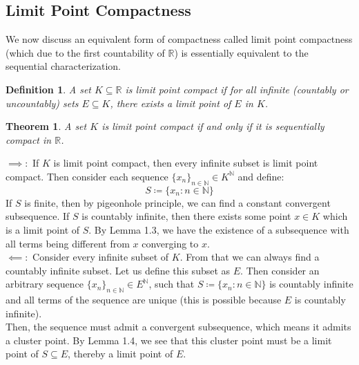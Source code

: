 \documentclass[10pt,letterpaper]{article} %
\newtheorem{thm}{Theorem}[section]
\newtheorem{defn}{Definition}[section]
\begin{document}
\subsection{Limit Point Compactness}
We now discuss an equivalent form of compactness called limit point compactness (which due to the first countability of $\mathbb{R}$) is essentially equivalent to the sequential characterization.

\begin{defn}
A set $K \subseteq \mathbb{R}$ is limit point compact if for all infinite (countably or uncountably) sets $E \subseteq K$, there exists a limit point of $E$ in $K$.
\end{defn}

\begin{thm}
A set $K$ is limit point compact if and only if it is sequentially compact in $\mathbb{R}$.
\end{thm}
$\implies:$ If $K$ is limit point compact, then every infinite subset is limit point compact. Then consider each sequence $\{x_n\}_{n \in \mathbb{N}} \in K^\mathbb{N}$ and define:
\begin{equation*}
S \coloneq \{x_n : n \in \mathbb{N}\}
\end{equation*}
If $S$ is finite, then by pigeonhole principle, we can find a constant convergent subsequence. If $S$ is countably infinite, then there exists some point $x \in K$ which is a limit point of $S$. By Lemma 1.3, we have the existence of a subsequence with all terms being different from $x$ converging to $x$.\\

$\impliedby:$ Consider every infinite subset of $K$. From that we can always find a countably infinite subset. Let us define this subset as $E$. Then consider an arbitrary sequence $\{x_n\}_{n \in \mathbb{N}} \in E^\mathbb{N}$, such that $S \coloneq \{x_n : n \in \mathbb{N}\}$ is countably infinite and all terms of the sequence are unique (this is possible because $E$ is countably infinite).\\

Then, the sequence must admit a convergent subsequence, which means it admits a cluster point. By Lemma 1.4, we see that this cluster point must be a limit point of $S \subseteq E$, thereby a limit point of $E$.
\end{document}
